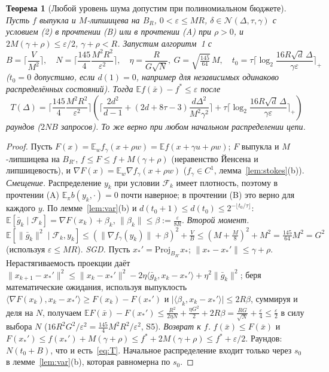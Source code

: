 \documentclass[11pt,a4paper]{article}
\numberwithin{equation}{section}
\newtheorem{theorem}{Теорема}[section]
\theoremstyle{definition}
\theoremstyle{remark}
\newcommand{\E}{\mathbb E}\newcommand{\R}{\mathbb R}\newcommand{\N}{\mathbb N}\let\Prob\relax\newcommand{\Prob}{\mathbb P}
\newcommand{\norm}[1]{\lVert #1\rVert}\newcommand{\abs}[1]{\lvert #1\rvert}\newcommand{\ip}[2]{\langle #1,#2\rangle}
\newcommand{\cN}{\mathcal N}\newcommand{\cG}{\mathcal G}\newcommand{\cF}{\mathcal F}\newcommand{\cS}{\mathcal S}
\begin{document}
\begin{theorem}[Любой уровень шума допустим при полиномиальном бюджете]\label{thm:alg}
Пусть $f$ выпукла и $M$-липшицева на $B_R$, $0<\varepsilon\le MR$, $\delta\in\cN(\Delta,\tau,\gamma)$ с условием (2) в прочтении (B) или в прочтении (A) при $\rho>0$, и $2M(\gamma+\rho)\le\varepsilon/2$, $\gamma+\rho<R$. Запустим алгоритм~1 с
\[
B=\Big\lceil\frac V{M^2}\Big\rceil,\quad N=\Big\lceil\frac{145}{4}\frac{M^2R^2}{\varepsilon^2}\Big\rceil,\quad \eta=\frac R{G\sqrt N},\ G=\sqrt{\tfrac{145}{64}}\,M,\quad
t_0=\tau\Big\lceil\log_2\frac{16R\sqrt d\,\Delta}{\gamma\varepsilon}\Big\rceil_+
\]
($t_0=0$ допустимо, если $d(1)=0$, например для независимых одинаково распределённых состояний). Тогда $\E f(\bar x)-f^*\le\varepsilon$ после
\begin{equation}\label{eq:T}
T(\Delta)=\Big\lceil\frac{145}{4}\frac{M^2R^2}{\varepsilon^2}\Big\rceil\left(\Big\lceil\frac{2d^2}{d-1}+(2d+8\tau-3)\frac{d\Delta^2}{M^2\gamma^2}\Big\rceil+\tau\Big\lceil\log_2\frac{16R\sqrt d\,\Delta}{\gamma\varepsilon}\Big\rceil_+\right)
\end{equation}
раундов ($2NB$ запросов). То же верно при любом начальном распределении цепи.
\end{theorem}
\begin{proof}
Пусть $F(x)=\E_wf_\gamma(x+\rho w)=\E f(x+\gamma u+\rho w)$; $F$ выпукла и $M$-липшицева на $B_{R'}$, $f\le F\le f+M(\gamma+\rho)$ (неравенство Йенсена и липшицевость), и $\nabla F(x)=\E_w\nabla f_\gamma(x+\rho w)$ ($f_\gamma\in C^1$, лемма~\ref{lem:stokes}(b)).
\emph{Смещение.} Распределение $y_k$ при условии $\mathcal F_k$ имеет плотность, поэтому в прочтении (A) $\E_\pi b(y_k,\cdot)=0$ почти наверное; в прочтении (B) это верно для каждого $y$. По лемме~\ref{lem:var}(b) и $d(t_0+1)\le d(t_0)\le2^{-\lfloor t_0/\tau\rfloor}$: $\E[\bar g_k\mid\mathcal F_k]=\nabla F(x_k)+\beta_k$, $\norm{\beta_k}\le\beta:=\frac{\varepsilon}{8R}$.
\emph{Второй момент.} $\E[\norm{\bar g_k}^2\mid\mathcal F_k,y_k]\le(\norm{\nabla f_\gamma(y_k)}+\beta)^2+\frac VB\le(M+\tfrac M8)^2+M^2=\tfrac{145}{64}M^2=G^2$ (используя $\varepsilon\le MR$).
\emph{SGD.} Пусть $x_*'=\mathrm{Proj}_{B_{R'}}x_*$; $\norm{x_*-x_*'}\le\gamma+\rho$. Нерастягиваемость проекции даёт
$\norm{x_{k+1}-x_*'}^2\le\norm{x_k-x_*'}^2-2\eta\ip{\bar g_k}{x_k-x_*'}+\eta^2\norm{\bar g_k}^2$; беря математические ожидания, используя выпуклость $\ip{\nabla F(x_k)}{x_k-x_*'}\ge F(x_k)-F(x_*')$ и $\abs{\ip{\beta_k}{x_k-x_*'}}\le2R\beta$, суммируя и деля на $N$, получаем
$\E F(\bar x)-F(x_*')\le\frac{R^2}{2\eta N}+\frac{\eta G^2}2+2R\beta=\frac{RG}{\sqrt N}+\frac\varepsilon4\le\frac\varepsilon2$ в силу выбора $N$ ($16R^2G^2/\varepsilon^2=\frac{145}4M^2R^2/\varepsilon^2$, S5).
\emph{Возврат к $f$.} $f(\bar x)\le F(\bar x)$ и $F(x_*')\le f(x_*')+M(\gamma+\rho)\le f^*+2M(\gamma+\rho)\le f^*+\varepsilon/2$.
Раундов: $N(t_0+B)$, что и есть~\eqref{eq:T}. Начальное распределение входит только через $s_0$ в лемме~\ref{lem:var}(b), которая равномерна по $s_0$.
\end{proof}
\end{document}
